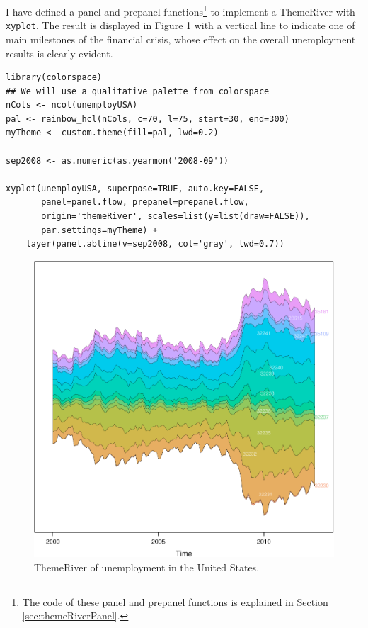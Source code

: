 I have defined a panel and prepanel functions\footnote{The code of these panel and prepanel functions is explained
in Section \ref{sec:themeRiverPanel}.} to implement a
ThemeRiver with \texttt{xyplot}. The result is displayed in Figure
\ref{fig:unemployUSAThemeRiver} with a vertical line to indicate
one of main milestones of the financial crisis, whose effect on
the overall unemployment results is clearly evident.
\lstset{language=R,numbers=none}
\begin{lstlisting}
library(colorspace)
## We will use a qualitative palette from colorspace
nCols <- ncol(unemployUSA)
pal <- rainbow_hcl(nCols, c=70, l=75, start=30, end=300)
myTheme <- custom.theme(fill=pal, lwd=0.2)

sep2008 <- as.numeric(as.yearmon('2008-09'))

xyplot(unemployUSA, superpose=TRUE, auto.key=FALSE,
       panel=panel.flow, prepanel=prepanel.flow,
       origin='themeRiver', scales=list(y=list(draw=FALSE)),
       par.settings=myTheme) +
    layer(panel.abline(v=sep2008, col='gray', lwd=0.7))
\end{lstlisting}

\begin{figure}[htb]
\centering
\includegraphics[width=.9\linewidth]{figs/unemployUSAThemeRiver.pdf}
\caption{\label{fig:unemployUSAThemeRiver}ThemeRiver of unemployment in the United States.}
\end{figure}


